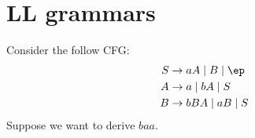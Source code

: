 
\newcommand\FIRST{\mathsc{First}}
\newcommand\FOLLOW{\mathsc{Follow}}

\section{LL grammars}

\begin{eg}
  Consider the follow CFG:
  \begin{align*}
    S &\rightarrow aA \mid B \mid \ep \\
    A &\rightarrow a \mid bA \mid S \\
    B &\rightarrow bBA \mid aB \mid S
  \end{align*}
  Suppose we want to derive $baa$.
\end{eg}

